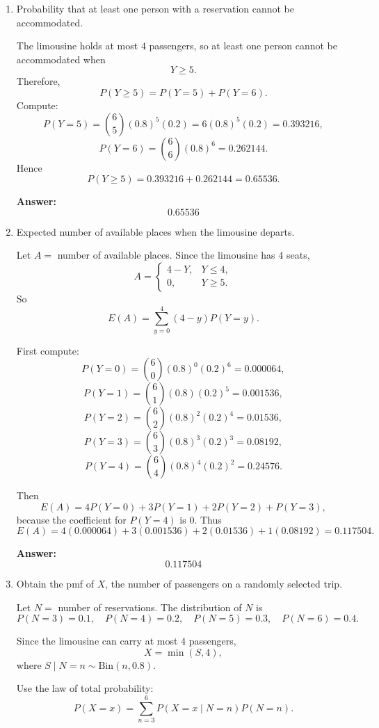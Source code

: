 \documentclass[11pt]{article}
\begin{document}
\begin{enumerate}
    \item[(a)] Probability that at least one person with a reservation cannot be accommodated.

    The limousine holds at most \(4\) passengers, so at least one person cannot be accommodated when
    \[
    Y\ge 5.
    \]
    Therefore,
    \[
    P(Y\ge 5)=P(Y=5)+P(Y=6).
    \]
    Compute:
    \[
    P(Y=5)=\binom{6}{5}(0.8)^5(0.2)=6(0.8)^5(0.2)=0.393216,
    \]
    \[
    P(Y=6)=\binom{6}{6}(0.8)^6=0.262144.
    \]
    Hence
    \[
    P(Y\ge 5)=0.393216+0.262144=0.65536.
    \]

    \textbf{Answer:}
    \[
    \boxed{0.65536}
    \]

    \item[(b)] Expected number of available places when the limousine departs.

    Let \(A=\) number of available places. Since the limousine has \(4\) seats,
    \[
    A=
    \begin{cases}
    4-Y, & Y\le 4,\\
    0, & Y\ge 5.
    \end{cases}
    \]
    So
    \[
    E(A)=\sum_{y=0}^{4}(4-y)P(Y=y).
    \]

    First compute:
    \[
    P(Y=0)=\binom{6}{0}(0.8)^0(0.2)^6=0.000064,
    \]
    \[
    P(Y=1)=\binom{6}{1}(0.8)(0.2)^5=0.001536,
    \]
    \[
    P(Y=2)=\binom{6}{2}(0.8)^2(0.2)^4=0.01536,
    \]
    \[
    P(Y=3)=\binom{6}{3}(0.8)^3(0.2)^3=0.08192,
    \]
    \[
    P(Y=4)=\binom{6}{4}(0.8)^4(0.2)^2=0.24576.
    \]

    Then
    \[
    E(A)=4P(Y=0)+3P(Y=1)+2P(Y=2)+P(Y=3),
    \]
    because the coefficient for \(P(Y=4)\) is \(0\). Thus
    \[
    E(A)=4(0.000064)+3(0.001536)+2(0.01536)+1(0.08192)=0.117504.
    \]

    \textbf{Answer:}
    \[
    \boxed{0.117504}
    \]

    \item[(c)] Obtain the pmf of \(X\), the number of passengers on a randomly selected trip.

    Let \(N=\) number of reservations. The distribution of \(N\) is
    \[
    P(N=3)=0.1,\quad P(N=4)=0.2,\quad P(N=5)=0.3,\quad P(N=6)=0.4.
    \]

    Since the limousine can carry at most \(4\) passengers,
    \[
    X=\min(S,4),
    \]
    where \(S\mid N=n \sim \mathrm{Bin}(n,0.8)\).

    Use the law of total probability:
    \[
    P(X=x)=\sum_{n=3}^{6} P(X=x\mid N=n)P(N=n).
    \]


\end{enumerate}
\end{document}

